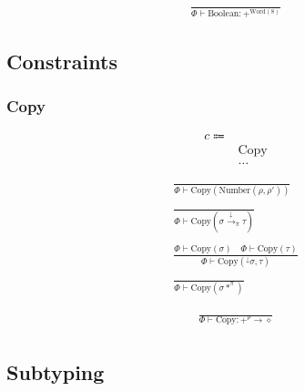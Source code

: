 \documentclass {article}
\begin{document}
\begin{gather*}
\frac
{}
{ \Phi \vdash \text{Boolean} : +^{\text{Word}(8)}}
\end{gather*}

\subsection{Constraints}

\subsubsection{Copy}
\begin{align*}
c \Coloneqq & \\
& \text{Copy} \\
& \dots
\end{align*}

\begin{gather*}
\frac
{}
{\Phi \vdash \text{Copy} (\text{Number} (\rho, \rho'))} \\
\\
\frac
{}
{\Phi \vdash \text{Copy} (\sigma \xrightarrow{\downarrow}_\pi \tau)} \\
\\
\frac
{\Phi \vdash \text{Copy}(\sigma) \quad \Phi \vdash \text{Copy}(\tau) }
{\Phi \vdash \text{Copy} (^\downarrow \sigma, \tau ) } \\
\\
\frac
{}
{\Phi \vdash \text{Copy} (\sigma *^\pi) }
\end{gather*}

\begin{gather*}
\frac
{}
{\Phi \vdash \text{Copy} : +^{\rho} \to \diamond} \\
\end{gather*}

\subsection{Subtyping}
\end{document}
